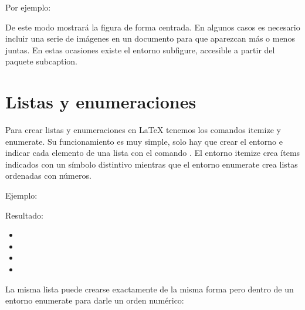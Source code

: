 \documentclass[11pt, a4paper]{article}
\begin{document}
	 

     

	 

Por ejemplo:





De este modo mostrará la figura de forma centrada. En algunos casos es necesario incluir una serie de imágenes en un documento para que aparezcan más o menos juntas. En estas ocasiones existe el entorno subfigure, accesible a partir del paquete subcaption.

\section{Listas y enumeraciones}

Para crear listas y enumeraciones en LaTeX tenemos los comandos itemize y enumerate. Su funcionamiento es muy simple, solo hay que crear el entorno e indicar cada elemento de una lista con el comando . El entorno itemize crea ítems indicados con un símbolo distintivo mientras que el entorno enumerate crea listas ordenadas con números.

Ejemplo:


		 

		 

		 

		 


Resultado:

	\begin{itemize}
		\item {}
		\item {}
		\item {}
		\item {}
	\end{itemize}

La misma lista puede crearse exactamente de la misma forma pero dentro de un entorno enumerate para darle un orden numérico:  
\end{document}
